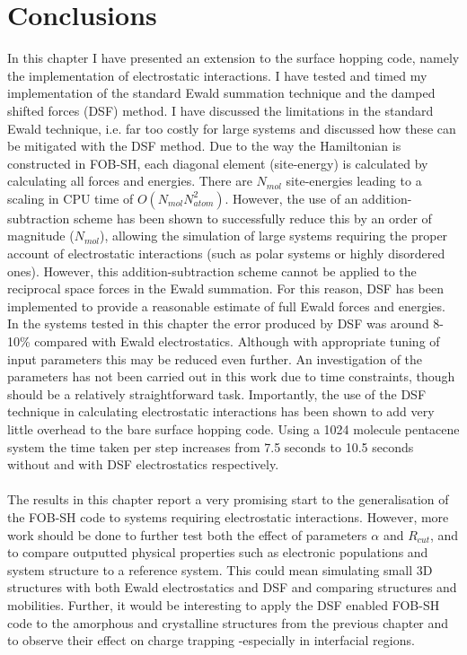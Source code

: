 
\section{Conclusions}
In this chapter I have presented an extension to the surface hopping code, namely the implementation of electrostatic interactions. I have tested and timed my implementation of the standard Ewald summation technique and the damped shifted forces (DSF) method. I have discussed the limitations in the standard Ewald technique, i.e. far too costly for large systems and discussed how these can be mitigated with the DSF method. Due to the way the Hamiltonian is constructed in FOB-SH, each diagonal element (site-energy) is calculated by calculating all forces and energies. There are $N_{mol}$ site-energies leading to a scaling in CPU time of $O(N_{mol} N_{atom}^2)$. However, the use of an addition-subtraction scheme has been shown to successfully reduce this by an order of magnitude ($N_{mol}$), allowing the simulation of large systems requiring the proper account of electrostatic interactions (such as polar systems or highly disordered ones). However, this addition-subtraction scheme cannot be applied to the reciprocal space forces in the Ewald summation. For this reason, DSF has been implemented to provide a reasonable estimate of full Ewald forces and energies. In the systems tested in this chapter the error produced by DSF was around 8-10\% compared with Ewald electrostatics. Although with appropriate tuning of input parameters this may be reduced even further. An investigation of the parameters has not been carried out in this work due to time constraints, though should be a relatively straightforward task. Importantly, the use of the DSF technique in calculating electrostatic interactions has been shown to add very little overhead to the bare surface hopping code. Using a 1024 molecule pentacene system the time taken per step increases from 7.5 seconds to 10.5 seconds without and with DSF electrostatics respectively.
\\\\
The results in this chapter report a very promising start to the generalisation of the FOB-SH code to systems requiring electrostatic interactions. However, more work should be done to further test both the effect of parameters $\alpha$ and $R_{cut}$, and to compare outputted physical properties such as electronic populations and system structure to a reference system. This could mean simulating small 3D structures with both Ewald electrostatics and DSF and comparing structures and mobilities. Further, it would be interesting to apply the DSF enabled FOB-SH code to the amorphous and crystalline structures from the previous chapter and to observe their effect on charge trapping -especially in interfacial regions.

